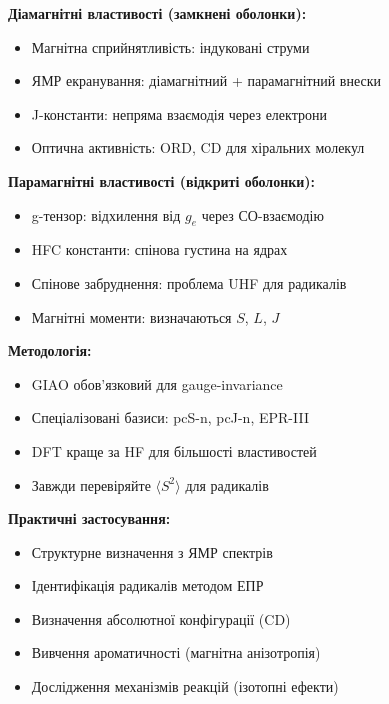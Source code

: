 \begin{tcolorbox}[colback=blue!5!white,colframe=blue!75!black,title=Ключові концепції]

\textbf{Діамагнітні властивості (замкнені оболонки):}
\begin{itemize}
    \item Магнітна сприйнятливість: індуковані струми
    \item ЯМР екранування: діамагнітний + парамагнітний внески
    \item J-константи: непряма взаємодія через електрони
    \item Оптична активність: ORD, CD для хіральних молекул
\end{itemize}

\textbf{Парамагнітні властивості (відкриті оболонки):}
\begin{itemize}
    \item g-тензор: відхилення від $g_e$ через СО-взаємодію
    \item HFC константи: спінова густина на ядрах
    \item Спінове забруднення: проблема UHF для радикалів
    \item Магнітні моменти: визначаються $S$, $L$, $J$
\end{itemize}

\textbf{Методологія:}
\begin{itemize}
    \item GIAO обов'язковий для gauge-invariance
    \item Спеціалізовані базиси: pcS-n, pcJ-n, EPR-III
    \item DFT краще за HF для більшості властивостей
    \item Завжди перевіряйте $\langle S^2 \rangle$ для радикалів
\end{itemize}

\end{tcolorbox}

\vspace{1em}

\textbf{Практичні застосування:}
\begin{itemize}
    \item Структурне визначення з ЯМР спектрів
    \item Ідентифікація радикалів методом ЕПР
    \item Визначення абсолютної конфігурації (CD)
    \item Вивчення ароматичності (магнітна анізотропія)
    \item Дослідження механізмів реакцій (ізотопні ефекти)
\end{itemize}